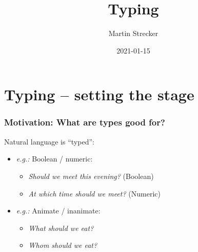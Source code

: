 \documentclass{beamer}
\title{Typing}
\author{Martin Strecker}
\date{2021-01-15}
\begin{document}

\begin{frame}
  \titlepage
\end{frame}



\section{Typing -- setting the stage}

\begin{frame}[fragile]\frametitle{Motivation: What are types good for?}

   Natural language is ``typed'':
  \begin{itemize}
  \item \emph{e.g.:} Boolean / numeric:
    \begin{itemize}
    \item \emph{Should we meet this evening?} (Boolean)
    \item \emph{At which time should we meet?} (Numeric)
    \end{itemize}
  \item \emph{e.g.:} Animate / inanimate:
    \begin{itemize}
    \item \emph{What should we eat?}
    \item \emph{Whom should we eat?}
    \end{itemize}
  \end{itemize}

\end{frame}
\end{document}
